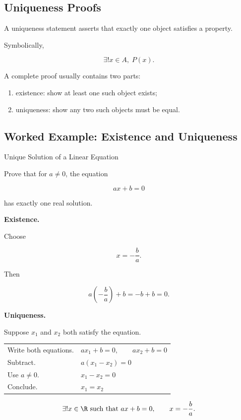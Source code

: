 \subsection{Uniqueness Proofs}
\label{subsec:uniqueness-proofs}

A uniqueness statement asserts that exactly one object satisfies a property.

Symbolically,

\[ \exists!x\in A,\;P(x). \]

A complete proof usually contains two parts:

\begin{enumerate}
    \item existence: show at least one such object exists;
    \item uniqueness: show any two such objects must be equal.
\end{enumerate}

\subsection{Worked Example: Existence and Uniqueness}
\label{subsec:worked-existence-uniqueness}

\begin{workedexamplebox}{Unique Solution of a Linear Equation}

Prove that for \(a\neq0\), the equation

\[ ax+b=0 \]

has exactly one real solution.

\textbf{Existence.}

Choose

\[ x=-\frac ba. \]

Then

\[ a\left(-\frac ba\right)+b=-b+b=0. \]

\textbf{Uniqueness.}

Suppose \(x_1\) and \(x_2\) both satisfy the equation.

\begin{tabularx}{\textwidth}{@{}>{\raggedright\arraybackslash}p{}X@{}}
Write both equations. & \(ax_1+b=0,\qquad ax_2+b=0\)\\
Subtract. & \(a(x_1-x_2)=0\)\\
Use \(a\neq0\). & \(x_1-x_2=0\)\\
Conclude. & \(x_1=x_2\)
\end{tabularx}

\begin{answerbox}
\[ \exists!x\in\R\text{ such that }ax+b=0,\qquad x=-\frac ba. \]
\end{answerbox}
\end{workedexamplebox}

